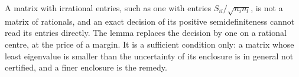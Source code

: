 
A matrix with irrational entries, such as one with entries
$S_{il}/\sqrt{n_in_l}$, is not a matrix of rationals, and an exact decision of
its positive semidefiniteness cannot read its entries directly. The lemma replaces the decision by one on a rational centre, at the
price of a margin. It is a sufficient condition only: a matrix whose least
eigenvalue is smaller than the uncertainty of its enclosure is in general not
certified, and a finer enclosure is the remedy.

